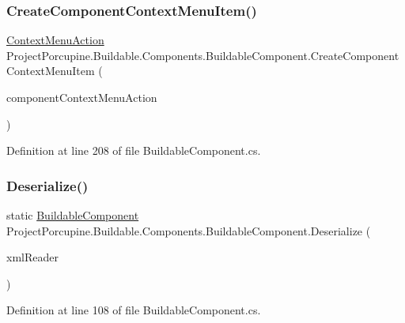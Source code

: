 \subsubsection{\texorpdfstring{Create\+Component\+Context\+Menu\+Item()}{CreateComponentContextMenuItem()}}
{\footnotesize\ttfamily \hyperlink{class_context_menu_action}{Context\+Menu\+Action} Project\+Porcupine.\+Buildable.\+Components.\+Buildable\+Component.\+Create\+Component\+Context\+Menu\+Item (\begin{DoxyParamCaption}\item[{\hyperlink{class_component_context_menu}{Component\+Context\+Menu}}]{component\+Context\+Menu\+Action }\end{DoxyParamCaption})\hspace{0.3cm}{\ttfamily [protected]}}



Definition at line 208 of file Buildable\+Component.\+cs.

\mbox{\label{class_project_porcupine_1_1_buildable_1_1_components_1_1_buildable_component_a0d0366b27cc355c8c02b99de39b2ae3f}} 
\subsubsection{\texorpdfstring{Deserialize()}{Deserialize()}\hspace{0.1cm}{\footnotesize\ttfamily [1/2]}}
{\footnotesize\ttfamily static \hyperlink{class_project_porcupine_1_1_buildable_1_1_components_1_1_buildable_component}{Buildable\+Component} Project\+Porcupine.\+Buildable.\+Components.\+Buildable\+Component.\+Deserialize (\begin{DoxyParamCaption}\item[{Xml\+Reader}]{xml\+Reader }\end{DoxyParamCaption})\hspace{0.3cm}{\ttfamily [static]}}



Definition at line 108 of file Buildable\+Component.\+cs.

